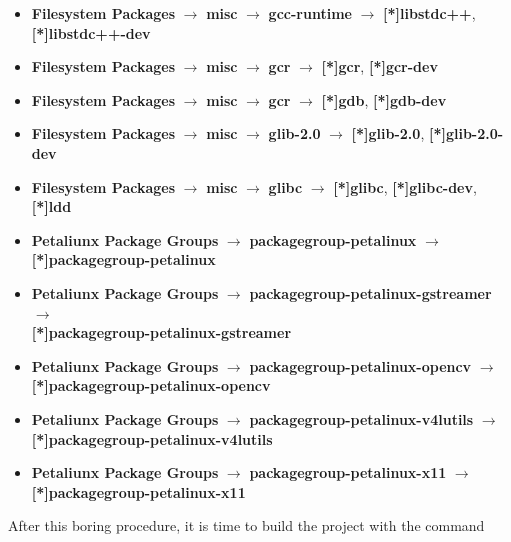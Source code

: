 \begin{itemize}
	\item \textbf{Filesystem Packages} $\rightarrow$ \textbf{misc} $\rightarrow$ \textbf{gcc-runtime} $\rightarrow$ \textbf{[*]libstdc++}, \\ \textbf{[*]libstdc++-dev}
	
	\item \textbf{Filesystem Packages} $\rightarrow$ \textbf{misc} $\rightarrow$ \textbf{gcr} $\rightarrow$ \textbf{[*]gcr}, \textbf{[*]gcr-dev}
	
	\item \textbf{Filesystem Packages} $\rightarrow$ \textbf{misc} $\rightarrow$ \textbf{gcr} $\rightarrow$ \textbf{[*]gdb}, \textbf{[*]gdb-dev}
	
	\item \textbf{Filesystem Packages} $\rightarrow$ \textbf{misc} $\rightarrow$ \textbf{glib-2.0} $\rightarrow$ \textbf{[*]glib-2.0}, \textbf{[*]glib-2.0-dev}
	
	\item \textbf{Filesystem Packages} $\rightarrow$ \textbf{misc} $\rightarrow$ \textbf{glibc} $\rightarrow$ \textbf{[*]glibc}, \textbf{[*]glibc-dev}, \textbf{[*]ldd}
	
	\item \textbf{Petaliunx Package Groups} $\rightarrow$ \textbf{packagegroup-petalinux} $\rightarrow$ \\ \textbf{[*]packagegroup-petalinux}
	
	\item \textbf{Petaliunx Package Groups} $\rightarrow$ \textbf{packagegroup-petalinux-gstreamer} $\rightarrow$\\ \textbf{[*]packagegroup-petalinux-gstreamer}
	
	\item \textbf{Petaliunx Package Groups} $\rightarrow$ \textbf{packagegroup-petalinux-opencv} $\rightarrow$\\ \textbf{[*]packagegroup-petalinux-opencv}
	
	\item \textbf{Petaliunx Package Groups} $\rightarrow$ \textbf{packagegroup-petalinux-v4lutils} $\rightarrow$\\ \textbf{[*]packagegroup-petalinux-v4lutils}
	
	\item \textbf{Petaliunx Package Groups} $\rightarrow$ \textbf{packagegroup-petalinux-x11} $\rightarrow$\\ \textbf{[*]packagegroup-petalinux-x11}
\end{itemize}
After this boring procedure, it is time to build the project with the command
